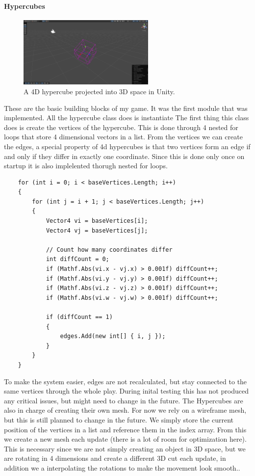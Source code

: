 \documentclass{article}
\begin{document}
\paragraph{Hypercubes}
\begin{figure}
    \label{fig:hypercube}
    \centering
    \includegraphics[width=0.6\textwidth]{./Dev/HyperCube1.png}
    \caption{A 4D hypercube projected into 3D space in Unity.}
\end{figure}
These are the basic building blocks of my game. It was the first module that was implemented. All the hypercube class does is instantiate 
The first thing this class does is create the vertices of the hypercube. This is done through 4 nested for loops that store 4 dimensional vectors in a list. 
From the vertices we can create the edges, a special property of 4d hypercubes is that two vertices form an edge if and only if they differ in exactly one coordinate. Since this is done only once on startup it is also implelented thorugh nested for loops.
\begin{verbatim}
    for (int i = 0; i < baseVertices.Length; i++)
    {
        for (int j = i + 1; j < baseVertices.Length; j++)
        {
            Vector4 vi = baseVertices[i];
            Vector4 vj = baseVertices[j];

            // Count how many coordinates differ
            int diffCount = 0;
            if (Mathf.Abs(vi.x - vj.x) > 0.001f) diffCount++;
            if (Mathf.Abs(vi.y - vj.y) > 0.001f) diffCount++;
            if (Mathf.Abs(vi.z - vj.z) > 0.001f) diffCount++;
            if (Mathf.Abs(vi.w - vj.w) > 0.001f) diffCount++;

            if (diffCount == 1)
            {
                edges.Add(new int[] { i, j });
            }
        }
    }
\end{verbatim}
To make the system easier, edges are not recalculated, but stay connected to the same vertices through the whole play. During inital testing this has not produced any critical issues, but might need to change in the future.
The Hypercubes are also in charge of creating their own mesh. For now we rely on a wireframe mesh, but this is still planned to change in the future. We simply store the current position of the vertices in a list and reference them in the index array. From this we create a new mesh each update (there is a lot of room for optimization here). This is necessary since we are not simply creating an object in 3D space, but we are rotating in 4 dimensions and create a different 3D cut each update, in addition we a interpolating the rotations to make the movement look smooth..
\end{document}
